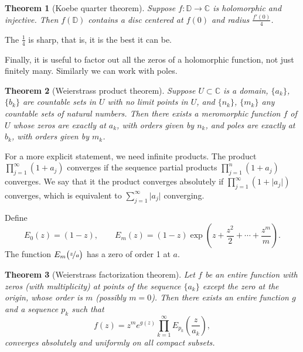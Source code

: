 \documentclass[12pt,openany]{book}
\newcommand{\sabs}[1]{\lvert {#1} \rvert}
\newcommand{\C}{{\mathbb{C}}}
\newcommand{\D}{{\mathbb{D}}}
\theoremstyle{plain}
\newtheorem{thm}{Theorem}[section]
\theoremstyle{remark}
\theoremstyle{definition}
\theoremstyle{exercise}
\theoremstyle{example}
\begin{document}
\begin{thm}[Koebe quarter theorem]
Suppose $f \colon \D \to \C$ is holomorphic and injective.  Then
$f(\D)$ contains a disc centered at $f(0)$ and radius $\frac{f'(0)}{4}$.
\end{thm}

The $\frac{1}{4}$ is sharp, that is, it is the best it can be.

\medskip

Finally, it is useful to factor out all the zeros of a holomorphic function,
not just finitely many.  Similarly we can work with poles.

\begin{thm}[Weierstrass product theorem]
Suppose $U \subset \C$ is a domain, $\{ a_k \}$, $\{ b_k \}$ are
countable sets in $U$
with no limit points in $U$, and $\{ n_k \}$, $\{ m_k \}$ any countable sets of
natural numbers.
Then there exists a meromorphic function $f$ of $U$ whose
zeros are exactly at $a_k$, with orders given by $n_k$, and
poles are exactly at $b_k$, with orders given by $m_k$.
\end{thm}

For a more explicit statement, we need infinite products.  The product
$\prod_{j=1}^\infty (1+a_j)$
converges if the sequence partial products
$\prod_{j=1}^n (1+a_j)$ converges.  We say that it the product converges
absolutely if
$\prod_{j=1}^\infty (1+\sabs{a_j})$
converges, which is equivalent to $\sum_{j=1}^\infty \sabs{a_j}$ converging.

Define
\begin{equation*}
E_0(z) = (1-z), \qquad
E_m(z) = (1-z) \exp\left( z +\frac{z^2}{2} + \cdots + \frac{z^m}{m} \right)
.
\end{equation*}
The function $E_m\bigl(\nicefrac{z}{a}\bigr)$ has a zero of order 1 at $a$.

\begin{thm}[Weierstrass factorization theorem]
Let $f$ be an entire function with zeros (with multiplicity) at points of
the sequence $\{ a_k \}$ except the zero at
the origin, whose order is $m$ (possibly $m=0$).  Then there exists an
entire function $g$ and a sequence $p_k$ such that
\begin{equation*}
f(z) = z^m e^{g(z)} \prod_{k=1}^\infty E_{p_k}\left(\frac{z}{a_k}\right) ,
\end{equation*}
converges absolutely and uniformly on all compact subsets.
\end{thm}
\end{document}

